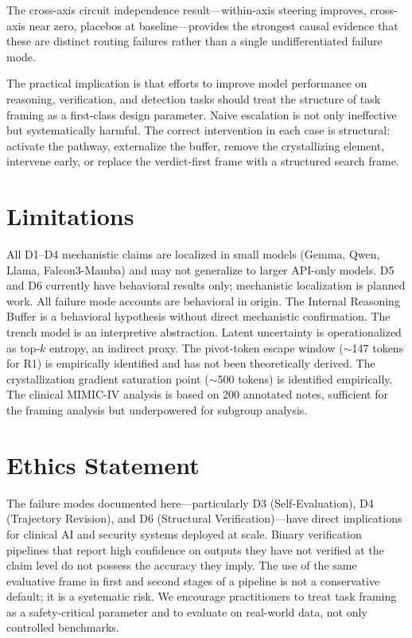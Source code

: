\documentclass[11pt]{article}
\newcommand{\irb}{Internal Reasoning Buffer}
\begin{document}
The cross-axis circuit independence result---within-axis steering
improves, cross-axis near zero, placebos at baseline---provides the
strongest causal evidence that these are distinct routing failures rather
than a single undifferentiated failure mode.

The practical implication is that efforts to improve model performance on
reasoning, verification, and detection tasks should treat the structure of
task framing as a first-class design parameter. Naive escalation is not
only ineffective but systematically harmful. The correct intervention in
each case is structural: activate the pathway, externalize the buffer,
remove the crystallizing element, intervene early, or replace the
verdict-first frame with a structured search frame.

\section*{Limitations}

All D1--D4 mechanistic claims are localized in small models (Gemma,
Qwen, Llama, Falcon3-Mamba) and may not generalize to larger API-only
models. D5 and D6 currently have behavioral results only; mechanistic
localization is planned work. All failure mode accounts are behavioral
in origin. The \irb{} is a behavioral hypothesis without direct
mechanistic confirmation. The trench model is an interpretive
abstraction. Latent uncertainty is operationalized as top-$k$ entropy,
an indirect proxy. The pivot-token escape window ($\sim$147 tokens for
R1) is empirically identified and has not been theoretically derived.
The crystallization gradient saturation point ($\sim$500 tokens) is
identified empirically. The clinical MIMIC-IV analysis is based on 200
annotated notes, sufficient for the framing analysis but underpowered
for subgroup analysis.

\section*{Ethics Statement}

The failure modes documented here---particularly D3 (Self-Evaluation),
D4 (Trajectory Revision), and D6 (Structural Verification)---have direct
implications for clinical AI and security systems deployed at scale.
Binary verification pipelines that report high confidence on outputs they
have not verified at the claim level do not possess the accuracy they
imply. The use of the same evaluative frame in first and second stages of
a pipeline is not a conservative default; it is a systematic risk. We
encourage practitioners to treat task framing as a safety-critical
parameter and to evaluate on real-world data, not only controlled
benchmarks.
\end{document}
